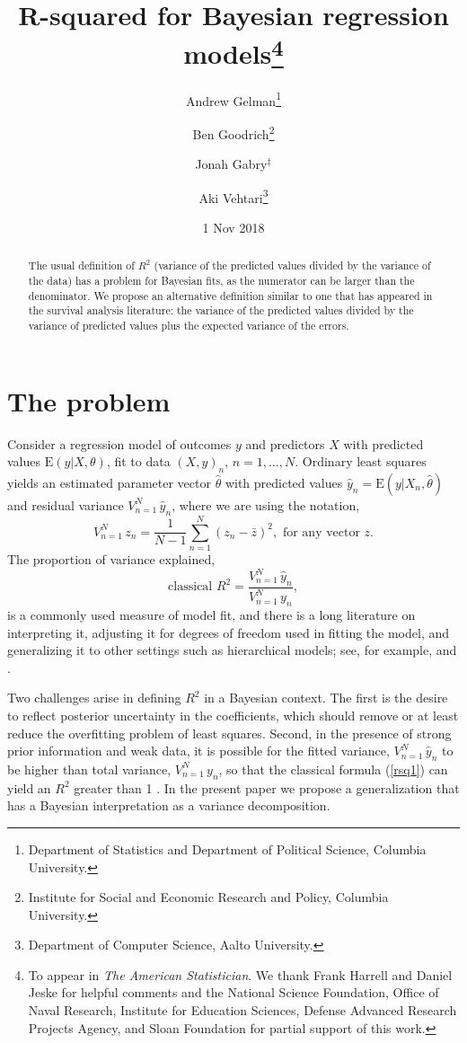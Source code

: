 \documentclass[11pt]{article}
\title{\bf R-squared for Bayesian regression models\footnote{To appear in {\em The American Statistician}.
  We thank Frank Harrell and Daniel Jeske for helpful comments and the National Science Foundation,
  Office of Naval Research, Institute for Education Sciences, Defense Advanced Research Projects Agency, and Sloan Foundation
  for partial support of this work.}\vspace{.1in}}
\author{Andrew Gelman\footnote{Department of Statistics and Department of Political Science, Columbia University.}
  \and Ben Goodrich\footnote{Institute for Social and Economic Research and Policy, Columbia University.}
  \and Jonah Gabry$^\ddagger$
\and Aki Vehtari\footnote{Department of Computer Science, Aalto University.}\vspace{.1in}}
\date{1 Nov 2018\vspace{-.1in}}
\begin{document}
\sloppy
\maketitle
\thispagestyle{empty}

\begin{abstract}
The usual definition of $R^2$ (variance of the predicted values divided by the
variance of the data) has a problem for Bayesian fits, as the numerator can be
larger than the denominator.  We propose an alternative definition similar to
one that has appeared in the survival analysis literature:  the variance of the
predicted values divided by the variance of predicted values plus the expected variance 
of the errors.
\end{abstract}

\section{The problem}

Consider a regression model of outcomes $y$ and predictors $X$ with predicted
values $\mbox{E}(y|X,\theta)$, fit to data $(X,y)_n, \, n=1,\ldots,N$.  Ordinary
least squares yields an estimated parameter vector $\hat{\theta}$
with predicted values $\hat{y}_n = \mbox{E}(y | X_n, \hat{\theta})$ and residual
variance $V_{n=1}^N \,\hat{y}_n$, where we are using the notation,
%
$$
V_{n=1}^N \, z_n = \frac{1}{N-1}\sum_{n=1}^N (z_n - \bar{z})^2, \mbox{ for any vector }z.
$$
%
The proportion of variance explained,
%
\begin{equation}\label{rsq1}
\mbox{classical } R^2 = \frac{V_{n=1}^N \,\hat{y}_n}{V_{n=1}^N \,y_n},
\end{equation}
%
is a commonly used measure of model fit, and there is a long literature on
interpreting it, adjusting it for degrees of freedom used in fitting the model,
and generalizing it to other settings such as hierarchical models; see, for example, \cite{Xu2003}
and \cite{GelmanPardoe2006}.

Two challenges arise in defining $R^2$ in a Bayesian context.  The first is the desire to reflect posterior uncertainty in the coefficients, which should remove or at least reduce the overfitting problem of least squares.  Second, in the presence of strong prior information and weak data, it is possible for the fitted variance, $V_{n=1}^N \,\hat{y}_n$  to be higher than total variance, $V_{n=1}^N \,y_n$, so that the classical formula (\ref{rsq1}) can yield an $R^2$ greater than 1 \citep{Tjur2009}.  In the present paper we propose a generalization that has a Bayesian interpretation as a variance decomposition.
\end{document}
